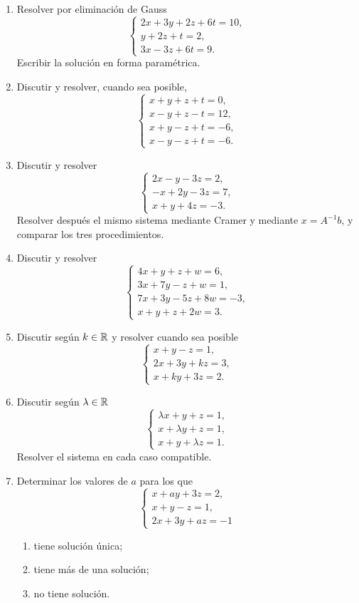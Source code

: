 \begin{enumerate}[label=\textbf{\arabic*.},leftmargin=*]
\item Resolver por eliminación de Gauss
\[
\begin{cases}
2x+3y+2z+6t=10,\\
y+2z+t=2,\\
3x-3z+6t=9.
\end{cases}
\]
Escribir la solución en forma paramétrica.

\item Discutir y resolver, cuando sea posible,
\[
\begin{cases}
x+y+z+t=0,\\
x-y+z-t=12,\\
x+y-z+t=-6,\\
x-y-z+t=-6.
\end{cases}
\]

\item Discutir y resolver
\[
\begin{cases}
2x-y-3z=2,\\
-x+2y-3z=7,\\
x+y+4z=-3.
\end{cases}
\]
Resolver después el mismo sistema mediante Cramer y mediante $x=A^{-1}b$, y comparar los tres procedimientos.

\item Discutir y resolver
\[
\begin{cases}
4x+y+z+w=6,\\
3x+7y-z+w=1,\\
7x+3y-5z+8w=-3,\\
x+y+z+2w=3.
\end{cases}
\]

\item Discutir según $k\in\mathbb{R}$ y resolver cuando sea posible
\[
\begin{cases}
x+y-z=1,\\
2x+3y+kz=3,\\
x+ky+3z=2.
\end{cases}
\]

\item Discutir según $\lambda\in\mathbb{R}$
\[
\begin{cases}
\lambda x+y+z=1,\\
x+\lambda y+z=1,\\
x+y+\lambda z=1.
\end{cases}
\]
Resolver el sistema en cada caso compatible.

\item Determinar los valores de $a$ para los que
\[
\begin{cases}
x+ay+3z=2,\\
x+y-z=1,\\
2x+3y+az=-1
\end{cases}
\]
\begin{enumerate}[label=\alph*)]
\item tiene solución única;
\item tiene más de una solución;
\item no tiene solución.
\end{enumerate}


\end{enumerate}
